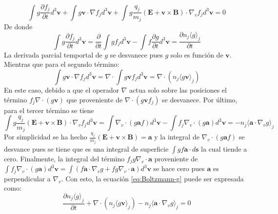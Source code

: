\documentclass[../tesis_main_file.tex]{subfiles}
\begin{document}
\begin{equation}
\label{eq:Boltzmann-g}
 \int g\frac{\partial f_j}{\partial t}d^3 \textbf{v}+ \int g\textbf{v}\cdot \nabla f_j d^3 \textbf{v} + \int g\frac{q_j}{m_j}\left( \textbf{E} + \textbf{v} \times \textbf{B}\right)\cdot \nabla _v f_j d^3 \textbf{v}=0
\end{equation}
De donde 
\begin{equation}
\int g\frac{\partial f_j}{\partial t}d^3 \textbf{v}=\frac{\partial}{\partial t}\int gf_jd^3\textbf{v}-\int f\frac{\partial g}{\partial t}d^3\textbf{v}=\frac{\partial n_j \langle g\rangle_j}{\partial t}
\end{equation}
La derivada parcial temportal de $g$ se desvanece pues $g$ solo es función de $\textbf{v}$.
Mientras que para el segundo término: 
\begin{equation}
\int g\textbf{v}\cdot \nabla f_j d^3 \textbf{v}= \nabla \cdot \int g\textbf{v}f_j d^3\textbf{v}=\nabla \cdot \left(n_j \langle g\textbf{v} \rangle_j \right)
\end{equation}
En este caso, debido a que el operador $\nabla$ actua solo sobre las posiciones el término $f_j \nabla \cdot (g\textbf{v})$ que proveniente de $\nabla \cdot (g\textbf{v}f_j)$ se desvanece.
Por último, para el tercer término se tiene
\begin{equation}
\int g\frac{q_j}{m_j}\left( \textbf{E} + \textbf{v} \times \textbf{B}\right)\cdot \nabla _v f_j d^3 \textbf{v}= \int \nabla_v\cdot (g\textbf{a}f)d^3\textbf{v}- \int f_j \nabla_v\cdot (g\textbf{a})d^3\textbf{v}=-n_j\langle \textbf{a}\cdot \nabla_v g\rangle_j
\end{equation}
Por simplicidad se ha hecho $\frac{q_j}{m_j}\left( \textbf{E} + \textbf{v} \times \textbf{B}\right)=\textbf{a}$ y la integral de $\nabla_v\cdot (g\textbf{a}f)$ se desvance pues se tiene que es una integral de superficie $\int gf\textbf{a}\cdot d\textbf{s}$ la cual tiende a cero. Finalmente, la integral  del término $f_jg\nabla_v \cdot \textbf{a}$ proveniente de $\int f_j\nabla _v \cdot (g\textbf{a})d^3\textbf{v} = \int (f\textbf{a} \cdot \nabla_v g + fg\nabla_v \cdot \textbf{a})d^3\textbf{v}$ se hace cero pues $\textbf{a}$ es perpendicular a $\nabla_v$. Con esto, la ecuación \ref{eq:Boltzmann-g} puede ser expresada como:
\begin{equation}
\label{eq:Boltzmann-Vlasov-promedios}
\frac{\partial n_j \langle g \rangle_j}{\partial t}+\nabla \cdot (n_j \langle g \textbf{v} \rangle_j)-n_j \langle \textbf{a}\cdot \nabla_v g \rangle_j=0
\end{equation}
\end{document}
